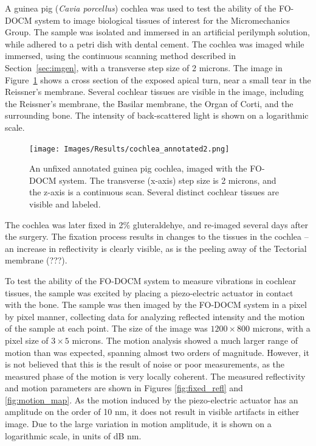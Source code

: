 A guinea pig ({\em Cavia porcellus}) cochlea was used to test the ability of the FO-DOCM system to image biological tissues of interest for the Micromechanics Group. The sample was isolated and immersed in an artificial perilymph solution, while adhered to a petri dish with dental cement. The cochlea was imaged while immersed, using the continuous scanning method described in Section~\ref{sec:imgen}, with a transverse step size of 2 microns. The image in Figure~\ref{fig:cochlea_image} shows a cross section of the exposed apical turn, near a small tear in the Reissner's membrane. Several cochlear tissues are visible in the image, including the Reissner's membrane, the Basilar membrane, the Organ of Corti, and the surrounding bone. The intensity of back-scattered light is shown on a logarithmic scale.

\begin{figure}[h!]
\centering
\texttt{[image: Images/Results/cochlea\_annotated2.png]}
\caption[An unfixed annotated guinea pig cochlea, imaged with the FO-DOCM system.]{An unfixed annotated guinea pig cochlea, imaged with the FO-DOCM system. The transverse (x-axis) step size is 2 microns, and the z-axis is a continuous scan. Several distinct cochlear tissues are visible and labeled. \label{fig:cochlea_image}}
\end{figure}

The cochlea was later fixed in 2\% gluteraldehye, and re-imaged several days after the surgery. The fixation process results in changes to the tissues in the cochlea -- an increase in reflectivity is clearly visible, as is the peeling away of the Tectorial membrane (???).

To test the ability of the FO-DOCM system to measure vibrations in cochlear tissues, the sample was excited by placing a piezo-electric actuator in contact with the bone. The sample was then imaged by the FO-DOCM system in a pixel by pixel manner, collecting data for analyzing reflected intensity and the motion of the sample at each point. The size of the image was $1200\times800$ microns, with a pixel size of $3\times5$ microns. The motion analysis showed a much larger range of motion than was expected, spanning almost two orders of magnitude. However, it is not believed that this is the result of noise or poor measurements, as the measured phase of the motion is very locally coherent. The measured reflectivity and motion parameters are shown in Figures \ref{fig:fixed_refl} and \ref{fig:motion_map}. As the motion induced by the piezo-electric actuator has an amplitude on the order of 10 nm, it does not result in visible artifacts in either image. Due to the large variation in motion amplitude, it is shown on a logarithmic scale, in units of dB nm.

